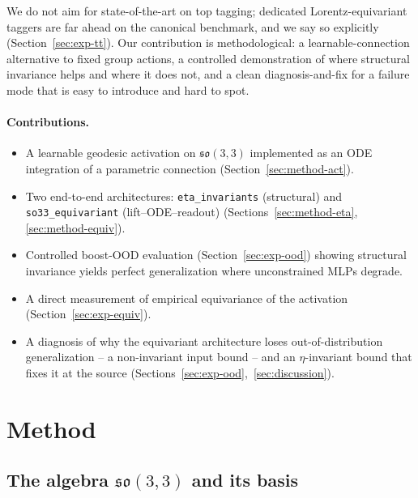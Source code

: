 \documentclass[11pt]{article}
\begin{document}
We do not aim for state-of-the-art on top tagging; dedicated
Lorentz-equivariant taggers are far ahead on the canonical benchmark,
and we say so explicitly (Section~\ref{sec:exp-tt}). Our contribution is
methodological: a learnable-connection alternative to fixed group
actions, a controlled demonstration of where structural invariance
helps and where it does not, and a clean diagnosis-and-fix for a failure
mode that is easy to introduce and hard to spot.

\paragraph{Contributions.}
\begin{itemize}
  \item A learnable geodesic activation on $\mathfrak{so}(3,3)$ implemented
        as an ODE integration of a parametric connection
        (Section~\ref{sec:method-act}).
  \item Two end-to-end architectures: \texttt{eta\_invariants} (structural)
        and \texttt{so33\_equivariant} (lift--ODE--readout)
        (Sections~\ref{sec:method-eta}, \ref{sec:method-equiv}).
  \item Controlled boost-OOD evaluation
        (Section~\ref{sec:exp-ood}) showing structural invariance
        yields perfect generalization where unconstrained MLPs degrade.
  \item A direct measurement of empirical equivariance of the activation
        (Section~\ref{sec:exp-equiv}).
  \item A diagnosis of why the equivariant architecture loses
        out-of-distribution generalization -- a non-invariant input
        bound -- and an $\eta$-invariant bound that fixes it at the
        source (Sections~\ref{sec:exp-ood},~\ref{sec:discussion}).
\end{itemize}

\section{Method}
\label{sec:method}

\subsection{The algebra \texorpdfstring{$\mathfrak{so}(3,3)$}{so(3,3)} and its basis}
\label{sec:method-algebra}
\end{document}
